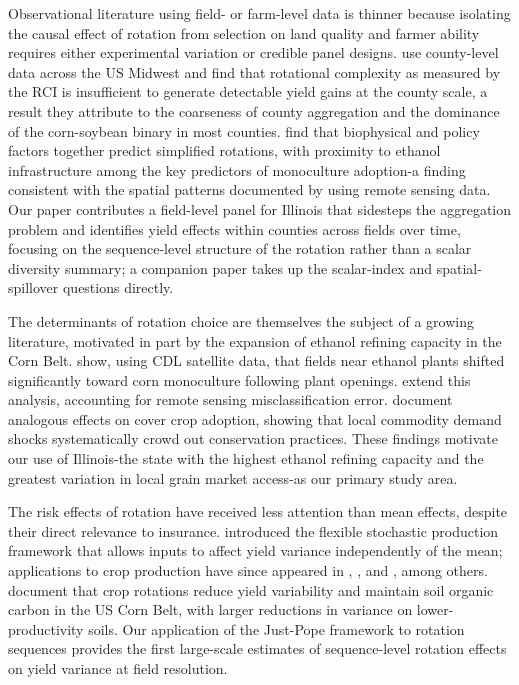 \documentclass[12pt,letterpaper]{article}
\theoremstyle{remark}
\theoremstyle{remark}
\theoremstyle{plain}
\theoremstyle{definition}
\begin{document}
Observational literature using field- or farm-level data is thinner because isolating the causal effect of rotation from selection on land quality and farmer ability requires either experimental variation or credible panel designs. \citet{burchfield2024} use county-level data across the US Midwest and find that rotational complexity as measured by the RCI is insufficient to generate detectable yield gains at the county scale, a result they attribute to the coarseness of county aggregation and the dominance of the corn-soybean binary in most counties. \citet{socolar2021} find that biophysical and policy factors together predict simplified rotations, with proximity to ethanol infrastructure among the key predictors of monoculture adoption-a finding consistent with the spatial patterns documented by \citet{pates2021} using remote sensing data. Our paper contributes a field-level panel for Illinois that sidesteps the aggregation problem and identifies yield effects within counties across fields over time, focusing on the sequence-level structure of the rotation rather than a scalar diversity summary; a companion paper takes up the scalar-index and spatial-spillover questions directly.

The determinants of rotation choice are themselves the subject of a growing literature, motivated in part by the expansion of ethanol refining capacity in the Corn Belt. \citet{pates2021} show, using CDL satellite data, that fields near ethanol plants shifted significantly toward corn monoculture following plant openings. \citet{Pates2025} extend this analysis, accounting for remote sensing misclassification error. \citet{cheu2025} document analogous effects on cover crop adoption, showing that local commodity demand shocks systematically crowd out conservation practices. These findings motivate our use of Illinois-the state with the highest ethanol refining capacity and the greatest variation in local grain market access-as our primary study area.

The risk effects of rotation have received less attention than mean effects, despite their direct relevance to insurance. \citet{Just1979} introduced the flexible stochastic production framework that allows inputs to affect yield variance independently of the mean; applications to crop production have since appeared in \citet{antle1983}, \citet{shi2013}, and \citet{li2021}, among
others. \citet{wu2025} document that crop rotations reduce yield variability and maintain soil organic carbon in the US Corn Belt, with larger reductions in variance on lower-productivity soils. Our application of the Just-Pope framework to rotation sequences provides the first large-scale estimates of sequence-level rotation effects on yield variance at field resolution.
\end{document}
